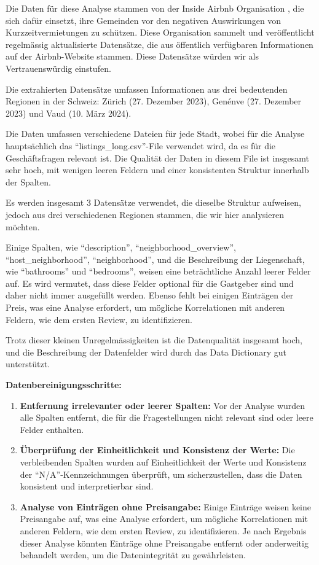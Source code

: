 \documentclass[
  journal,
]{IEEEtran}%
\begin{document}
Die Daten für diese Analyse stammen von der Inside Airbnb Organisation
, die sich dafür einsetzt,
ihre Gemeinden vor den negativen Auswirkungen von Kurzzeitvermietungen
zu schützen. Diese Organisation sammelt und veröffentlicht regelmässig
aktualisierte Datensätze, die aus öffentlich verfügbaren Informationen
auf der Airbnb-Website stammen. Diese Datensätze würden wir als
Vertrauenswürdig einstufen.

Die extrahierten Datensätze umfassen Informationen aus drei bedeutenden
Regionen in der Schweiz: Zürich (27. Dezember 2023), Genénve (27.
Dezember 2023) und Vaud (10. März 2024).

Die Daten umfassen verschiedene Dateien für jede Stadt, wobei für die
Analyse hauptsächlich das ``listings\_long.csv''-File verwendet wird, da
es für die Geschäftsfragen relevant ist. Die Qualität der Daten in
diesem File ist insgesamt sehr hoch, mit wenigen leeren Feldern und
einer konsistenten Struktur innerhalb der Spalten.

Es werden insgesamt 3 Datensätze verwendet, die dieselbe Struktur
aufweisen, jedoch aus drei verschiedenen Regionen stammen, die wir hier
analysieren möchten.

Einige Spalten, wie ``description'', ``neighborhood\_overview'',
``host\_neighborhood'', ``neighborhood'', und die Beschreibung der
Liegenschaft, wie ``bathrooms'' und ``bedrooms'', weisen eine
beträchtliche Anzahl leerer Felder auf. Es wird vermutet, dass diese
Felder optional für die Gastgeber sind und daher nicht immer ausgefüllt
werden. Ebenso fehlt bei einigen Einträgen der Preis, was eine Analyse
erfordert, um mögliche Korrelationen mit anderen Feldern, wie dem ersten
Review, zu identifizieren.

Trotz dieser kleinen Unregelmässigkeiten ist die Datenqualität insgesamt
hoch, und die Beschreibung der Datenfelder wird durch das Data
Dictionary  gut unterstützt.

\textbf{Datenbereinigungsschritte:}

\begin{enumerate}
\def\labelenumi{\arabic{enumi}.}
\item
  \textbf{Entfernung irrelevanter oder leerer Spalten:} Vor der Analyse
  wurden alle Spalten entfernt, die für die Fragestellungen nicht
  relevant sind oder leere Felder enthalten.
\item
  \textbf{Überprüfung der Einheitlichkeit und Konsistenz der Werte:} Die
  verbleibenden Spalten wurden auf Einheitlichkeit der Werte und
  Konsistenz der ``N/A''-Kennzeichnungen überprüft, um sicherzustellen,
  dass die Daten konsistent und interpretierbar sind.
\item
  \textbf{Analyse von Einträgen ohne Preisangabe:} Einige Einträge
  weisen keine Preisangabe auf, was eine Analyse erfordert, um mögliche
  Korrelationen mit anderen Feldern, wie dem ersten Review, zu
  identifizieren. Je nach Ergebnis dieser Analyse könnten Einträge ohne
  Preisangabe entfernt oder anderweitig behandelt werden, um die
  Datenintegrität zu gewährleisten.
\end{enumerate}
\end{document}
